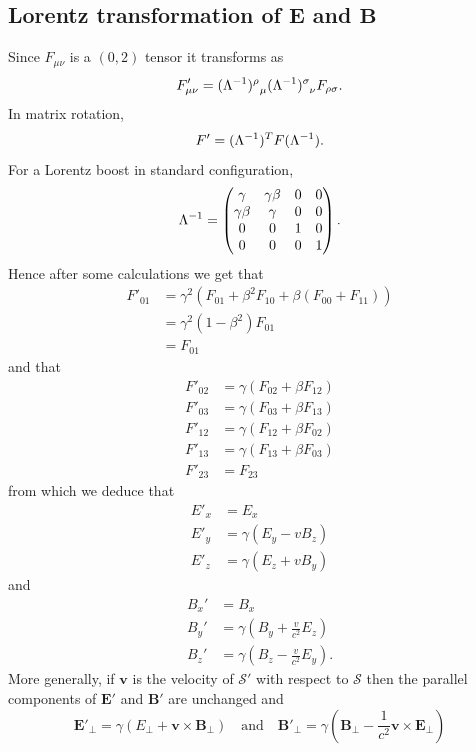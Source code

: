 \documentclass{article}
\newcommand{\glg}{\phantom{\mu}}
\begin{document}
\subsection{Lorentz transformation of $ \mathbf E  $ and $ \mathbf B $}
Since $ F_{\mu\nu} $ is a $ (0,2) $ tensor it transforms as
\[
	F'_{\mu\nu} = (\inv \Lambda)^{\rho}_{\glg \mu}(\inv \Lambda)^{\sigma}_{\glg \nu} F_{\rho \sigma}.
\]
In matrix rotation,
\[
  F' = ({\Lambda}^{-1})^T F({\Lambda}^{-1}).
\]
For a Lorentz boost in standard configuration,
\[
  {\Lambda}^{-1} = \begin{pmatrix}
	  \gamma & \gamma\beta & 0 & 0 \\
	  \gamma\beta & \gamma & 0 & 0 \\
	  0 & 0 & 1 & 0 \\
	  0 & 0 & 0 & 1
  \end{pmatrix}.
\]
Hence after some calculations we get that
\begin{align*}
	F'_{01} &= \gamma^2(F_{01} + \beta^2 F_{10} + \beta(F_{00}+F_{11})) \\
		&= \gamma^2(1-\beta^2)F_{01} \\
		&= F_{01}
\end{align*}
and that
\begin{align*}
	F'_{02} &= \gamma(F_{02} + \beta F_{12}) \\
	F'_{03} &= \gamma(F_{03} + \beta F_{13}) \\
	F'_{12} &= \gamma(F_{12} + \beta F_{02}) \\
	F'_{13} &= \gamma(F_{13} + \beta F_{03}) \\
	F'_{23} &= F_{23}
\end{align*}
from which we deduce that 
\begin{align*}
	E'_x &= E_x \\
	E'_y &= \gamma(E_y - vB_z) \\
	E'_z &= \gamma(E_z + vB_y)
\end{align*}
and
\begin{align*}
	B_x' &= B_x \\
	B_y' &= \gamma(B_y + \frac v{c^2} E_z) \\
	B_z' &= \gamma(B_z - \frac v{c^2} E_y).
\end{align*}
More generally, if $ \mathbf v $ is the velocity of $ \mathcal S' $ with respect to $ \mathcal S $ then the parallel components of $ \mathbf E' $ and $ \mathbf B' $ are unchanged and
\[
	\mathbf E'_{\perp} = \gamma(E_\perp + \mathbf v \times\mathbf B_\perp) \quad \text{and} \quad \mathbf B'_\perp = \gamma(\mathbf B_\perp - \frac 1{c^2} \mathbf v \times \mathbf E_{\perp})
\]
\end{document}
